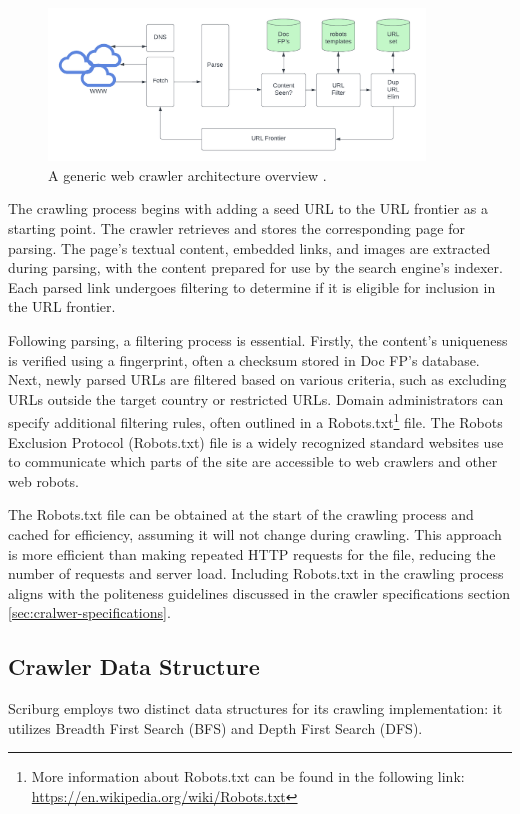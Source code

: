\begin{figure}[h]	
     \centering
     \includegraphics[width=10cm]{figures/crawler_architecture.png}
     \caption{A generic web crawler architecture overview \cite{manning2008}.}
     \label{fig:web-crawler-arch}
\end{figure}

The crawling process begins with adding a seed URL to the URL frontier as a starting point. The crawler retrieves and stores the corresponding page for parsing. The page's textual content, embedded links, and images are extracted during parsing, with the content prepared for use by the search engine's indexer. Each parsed link undergoes filtering to determine if it is eligible for inclusion in the URL frontier.

Following parsing, a filtering process is essential. Firstly, the content's uniqueness is verified using a fingerprint, often a checksum stored in Doc FP's database. Next, newly parsed URLs are filtered based on various criteria, such as excluding URLs outside the target country or restricted URLs. Domain administrators can specify additional filtering rules, often outlined in a Robots.txt\footnote{More information about Robots.txt can be found in the following link:  \url{https://en.wikipedia.org/wiki/Robots.txt}} file. The Robots Exclusion Protocol (Robots.txt) file is a widely recognized standard websites use to communicate which parts of the site are accessible to web crawlers and other web robots.

The Robots.txt file can be obtained at the start of the crawling process and cached for efficiency, assuming it will not change during crawling. This approach is more efficient than making repeated HTTP requests for the file, reducing the number of requests and server load. Including Robots.txt in the crawling process aligns with the politeness guidelines discussed in the crawler specifications section \ref{sec:cralwer-specifications}.

\subsection{Crawler Data Structure}
Scriburg employs two distinct data structures for its crawling implementation: it utilizes Breadth First Search (BFS) and Depth First Search (DFS).

